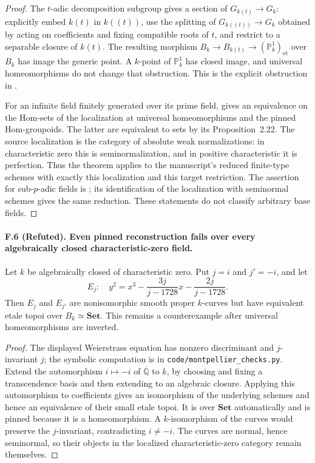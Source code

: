 \begin{proof}
The $t$-adic decomposition subgroup gives a section of
$G_{k(t)}\to G_k$: explicitly embed $k(t)$ in $k((t))$, use the splitting
of $G_{k((t))}\to G_k$ obtained by acting on coefficients and fixing
compatible roots of $t$, and restrict to a separable closure of $k(t)$.
The resulting morphism $B_k\to B_{k(t)}\to(\mathbb P^1_k)_{\mathrm{et}}$
over $B_k$ has image the generic point. A $k$-point of $\mathbb P^1_k$
has closed image, and universal homeomorphisms do not change that
obstruction. This is the explicit obstruction in
\cite[Example~2.30]{CHW2024}.

For an infinite field finitely generated over its prime field,
\cite[Theorem~0.1]{CHW2024} gives an equivalence on the Hom-sets of the
localization at universal homeomorphisms and the pinned Hom-groupoids.
The latter are equivalent to sets by its Proposition~2.22. The source
localization is the category of absolute weak normalizations: in
characteristic zero this is seminormalization, and in positive
characteristic it is perfection. Thus the theorem applies to the
manuscript's reduced finite-type schemes with exactly this localization
and this target restriction. The assertion for sub-$p$-adic fields is
\cite[Theorem~A, equivalently Theorem~4.1]{CarlsonStix2024}; its
identification of the localization with seminormal schemes gives the
same reduction. These statements do not classify arbitrary base fields.
\end{proof}

\paragraph{F.6 (Refuted). Even pinned reconstruction fails over every
algebraically closed characteristic-zero field.}
Let $k$ be algebraically closed of characteristic zero. Put $j=i$ and
$j'=-i$, and let
\[
 E_j:\quad y^2=x^3-\frac{3j}{j-1728}x-\frac{2j}{j-1728}.
\]
Then $E_j$ and $E_{j'}$ are nonisomorphic smooth proper $k$-curves but
have equivalent etale topoi over $B_k\simeq\mathbf{Set}$. This remains a
counterexample after universal homeomorphisms are inverted.

\begin{proof}
The displayed Weierstrass equation has nonzero discriminant and
$j$-invariant $j$; the symbolic computation is in
\texttt{code/montpellier\_checks.py}. Extend the automorphism
$i\mapsto-i$ of $\overline{\mathbb Q}$ to $k$, by choosing and fixing a
transcendence basis and then extending to an algebraic closure. Applying
this automorphism to coefficients gives an isomorphism of the underlying
schemes and hence an equivalence of their small etale topoi. It is over
$\mathbf{Set}$ automatically and is pinned because it is a homeomorphism.
A $k$-isomorphism of the curves would preserve the $j$-invariant,
contradicting $i\ne-i$. The curves are normal, hence seminormal, so their
objects in the localized characteristic-zero category remain themselves.
\end{proof}

